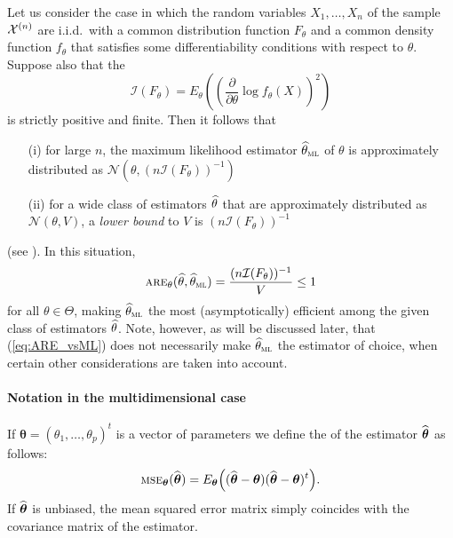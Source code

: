 Let us consider the case in which the random variables $X_1, \ldots, X_n$ of
the sample ${\cal X}^{(n)}$ are i.i.d.\ with a common distribution function
$F_{\theta}$ and a common density function $f_{\theta}$ that satisfies some
differentiability conditions with respect to $\theta$. Suppose also that the
\emph{}
\[
    \mathcal{I}\left(F_{\theta}\right) =
        E_{\theta}\left(\left(\frac{\partial}{\partial\theta}
        \log f_{\theta}(X)\right)^2\right)
\] 
is strictly positive and finite. Then it follows that
\begin{enumerate}
    \item[(i)] for large $n$, the maximum likelihood estimator
    $\sthat{\theta}_{\stsc{ML}}$ of $\theta$ is approximately distributed as
    $\mathcal{N}\left(\theta, (n \mathcal{I}(F_{\theta}))^{-1}\right)$
    
    \item[(ii)] for a wide class of estimators $\widehat{\theta}$ that are
    approximately distributed as $\mathcal{N}(\theta, V)$, a \emph{lower
    bound} to $V$ is $(n \mathcal{I}(F_{\theta}))^{-1}$
\end{enumerate}
(see \citealp{LehmannCasella1988}). In this situation,
%
\begin{equation}\label{eq:ARE_vsML}
    \stsc{ARE}_{\theta}(\sthat{\theta}, \sthat{\theta}_{\stsc{ML}})
     = \frac{(n \mathcal{I}(F_{\theta}))^{-1}}{V} \leq 1
\end{equation}
%
for all $\theta \in \Theta$, making $\sthat{\theta}_{\stsc{ML}}$ the most
(asymptotically) efficient among the given class of estimators
$\widehat{\theta}$. Note, however, as will be discussed later, that
(\ref{eq:ARE_vsML}) does not necessarily make $\sthat{\theta}_{\stsc{ML}}$ the
estimator of choice, when certain other considerations are taken into account.


\paragraph{Notation in the multidimensional case}

If $\boldsymbol\theta = (\theta_1, \dots, \theta_p)^t$ is a vector of parameters
we define the \emph{}
of the estimator $\widehat{\boldsymbol\theta}$ as follows:
\[
    \stsc{MSE}_{\boldsymbol\theta}(\sthat{\boldsymbol\theta})
    = E_{\boldsymbol\theta}\left((\sthat{\boldsymbol\theta} - \boldsymbol\theta)
                                 (\sthat{\boldsymbol\theta} - \boldsymbol\theta)^t
                           \right).
\]
If $\widehat{\boldsymbol\theta}$ is unbiased, the mean squared error matrix simply
coincides with the covariance matrix of the estimator.

